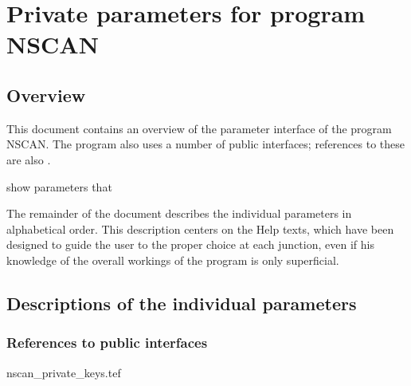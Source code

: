 
\chapter{ Private parameters for program NSCAN}
\tableofcontents


\section{ Overview}

	This document contains an overview of the parameter interface of the
program NSCAN. The program also uses a number of public interfaces; references
to these are also .

show %
parameters that %


	The remainder of the document describes the individual parameters in
alphabetical order. This description centers on the Help texts, which have been
designed to guide the user to the proper choice at each junction, even if his
knowledge of the overall workings of the program is only superficial.


\section{ Descriptions of the individual parameters}
\label{.descriptions}

\subsection{ References to public interfaces}
\label{.public}

 {nscan_private_keys.tef}
